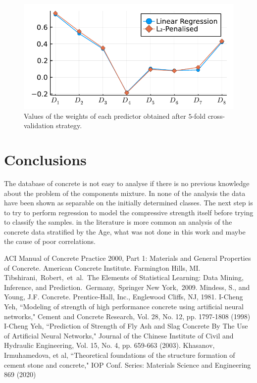\documentclass[conference]{IEEEtran}
\begin{document}
\begin{figure}[htbp]
\centerline{\includegraphics[width=\columnwidth]{../figures/fitted_params_kfolds}}
\caption{Values of the weights of each predictor obtained after $5$-fold cross-validation strategy.}%
\end{figure}







\section{Conclusions}\label{sec:conclusions}

The database of concrete is not easy to analyse if there is no previous knowledge about the problem of the components mixture. In none of the analysis the data have been shown as separable on the initially determined classes. The next step is to try to perform regression to model the compressive strength itself before trying to classify the samples. in the literature \cite{b6} is more common an analysis of the concrete data stratified by the Age, what was not done in this work and maybe the cause of poor correlations.

\begin{thebibliography}{00}
 ACI Manual of Concrete Practice 2000, Part 1: Materials and General Properties of Concrete.  American Concrete Institute.  Farmington Hills, MI.
 Tibshirani, Robert, et al. The Elements of  Statistical Learning:  Data Mining, Inference, and Prediction. Germany, Springer New York, 2009.
 Mindess, S., and Young, J.F. Concrete. Prentice-Hall, Inc., Englewood Cliffs, NJ, 1981.
 I-Cheng Yeh, ``Modeling of strength of high performance concrete using artificial neural networks," Cement and Concrete Research, Vol. 28, No. 12, pp. 1797-1808 (1998)
 I-Cheng Yeh, ``Prediction of Strength of Fly Ash and Slag Concrete By The Use of Artificial Neural Networks," Journal of the Chinese Institute of Civil and Hydraulic Engineering, Vol. 15, No. 4, pp. 659-663 (2003). 
 Khasanov, Irmuhamedova, et al, ``Theoretical foundations of the structure formation of cement stone
and concrete," IOP Conf. Series: Materials Science and Engineering 869 (2020)
\end{thebibliography}
\end{document}

